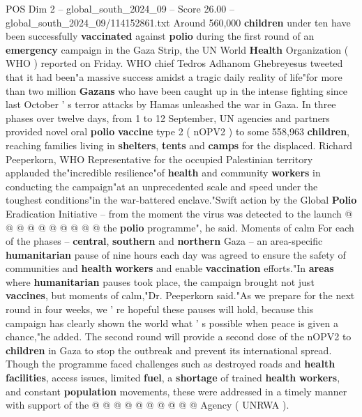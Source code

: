 \begin{textsample}{POS Dim 2 – global\_south\_2024\_09 – Score 26.00 – global\_south\_2024\_09/114152861.txt}  \label{ex:f2_pos_193}
Around 560,000 \textbf{children} under ten have been successfully \textbf{vaccinated} against \textbf{polio} during the first round of an \textbf{emergency} campaign in the Gaza Strip, the UN World \textbf{Health} Organization ( WHO ) reported on Friday.
WHO chief Tedros Adhanom Ghebreyesus tweeted that it had been"a massive success amidst a tragic daily reality of life"for more than two million \textbf{Gazans} who have been caught up in the intense fighting since last October ' s terror attacks by Hamas unleashed the war in Gaza.
In three phases over twelve days, from 1 to 12 September, UN agencies and partners provided novel oral \textbf{polio} \textbf{vaccine} type 2 ( nOPV2 ) to some 558,963 \textbf{children}, reaching families living in \textbf{shelters}, \textbf{tents} and \textbf{camps} for the displaced.
Richard Peeperkorn, WHO Representative for the occupied Palestinian territory applauded the"incredible resilience"of \textbf{health} and community \textbf{workers} in conducting the campaign"at an unprecedented scale and speed under the toughest conditions"in the war-battered enclave."Swift action by the Global \textbf{Polio} Eradication Initiative -- from the moment the virus was detected to the launch @ @ @ @ @ @ @ @ @ @ the \textbf{polio} programme", he said.
Moments of calm For each of the phases -- \textbf{central}, \textbf{southern} and \textbf{northern} Gaza -- an area-specific \textbf{humanitarian} pause of nine hours each day was agreed to ensure the safety of communities and \textbf{health} \textbf{workers} and enable \textbf{vaccination} efforts."In \textbf{areas} where \textbf{humanitarian} pauses took place, the campaign brought not just \textbf{vaccines}, but moments of calm,"Dr.
Peeperkorn said."As we prepare for the next round in four weeks, we ' re hopeful these pauses will hold, because this campaign has clearly shown the world what ' s possible when peace is given a chance,"he added.
The second round will provide a second dose of the nOPV2 to \textbf{children} in Gaza to stop the outbreak and prevent its international spread.
Though the programme faced challenges such as destroyed roads and \textbf{health} \textbf{facilities}, access issues, limited \textbf{fuel}, a \textbf{shortage} of trained \textbf{health} \textbf{workers}, and constant \textbf{population} movements, these were addressed in a timely manner with support of the @ @ @ @ @ @ @ @ @ @ Agency ( UNRWA ).

\end{textsample}

